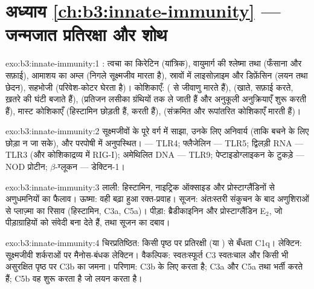 \section*{अध्याय \ref{ch:b3:innate-immunity} --- जन्मजात प्रतिरक्षा और शोथ}

\begin{solution}{exo:b3:innate-immunity:1}
: त्वचा का किरेटिन (यांत्रिक), वायुमार्ग की श्लेष्मा तथा 
(फँसाना और सफ़ाई), आमाशय का अम्ल (निगले सूक्ष्मजीव मारता है), स्रावों
में लाइसोज़ाइम और डिफ़ेंसिन (लयन तथा छेदन), सहभोजी 
(परिवेश-कोटर घेरता है)। कोशिकाएँ:  ( से जीवाणु मारते
हैं),  (खाते, सफ़ाई करते, ख़तरे की घंटी बजाते हैं),  (प्रतिजन लसीका ग्रंथियों तक ले जाती हैं और अनुकूली अनुक्रियाएँ
शुरू करती हैं), मास्ट कोशिकाएँ (हिस्टामिन छोड़ती हैं,  करती हैं),
 (संक्रमित और रूपांतरित कोशिकाएँ मारती हैं)।
\end{solution}

\begin{solution}{exo:b3:innate-immunity:2}
सूक्ष्मजीवों के पूरे वर्ग में साझा, उनके लिए अनिवार्य (ताकि बचने के लिए
छोड़ा न जा सके), और परपोषी में अनुपस्थित।  --- TLR4;
फ्लैजेलिन --- TLR5; द्विलड़ी RNA --- TLR3 (और कोशिकाद्रव्य में
RIG-I); अमेथिलित  DNA --- TLR9; पेप्टाइडोग्लाइकन के टुकड़े --- NOD
प्रोटीन; $\beta$-ग्लूकन --- डेक्टिन-1।
\end{solution}

\begin{solution}{exo:b3:innate-immunity:3}
लाली: हिस्टामिन, नाइट्रिक ऑक्साइड और प्रोस्टाग्लैंडिनों से अणुधमनियों
का फैलाव। ऊष्मा: वही बढ़ा हुआ रक्त-प्रवाह। सूजन: अंतःस्तरी संकुचन के
बाद अणुशिराओं से प्लाज़्मा का रिसाव (हिस्टामिन, C3a, C5a)।
पीड़ा: ब्रैडीकाइनिन और प्रोस्टाग्लैंडिन E$_{2}$, जो पीड़ाग्राहियों को
संवेदी बना देते हैं, तथा सूजन का दबाव।
\end{solution}

\begin{solution}{exo:b3:innate-immunity:4}
चिरप्रतिष्ठित: किसी पृष्ठ पर प्रतिरक्षी (या ) से
बँधता C1q। लेक्टिन: सूक्ष्मजीवी शर्कराओं पर मैनोस-बंधक लेक्टिन।
वैकल्पिक: स्वतःस्फूर्त C3 स्वतःचाल और किसी भी असुरक्षित पृष्ठ पर C3b का
जमना। परिणाम: C3b  के लिए  करता है; C3a और C5a  तथा
भर्ती करते हैं; C5b वह  शुरू करता है जो लयन करता है।
\end{solution}

